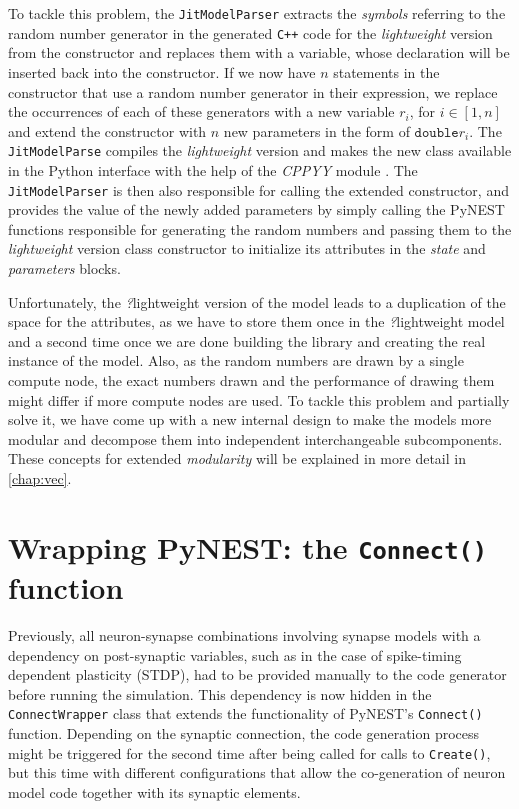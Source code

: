 To tackle this problem, the \texttt{JitModelParser} extracts the \emph{symbols} referring to the random number generator in the generated \texttt{C++} code for the \emph{lightweight} version from the constructor and replaces them with a variable, whose declaration will be inserted back into the constructor. If we now have $n$ statements in the constructor that use a random number generator in their expression, we replace the occurrences of each of these generators with a new variable $r_i$, for $i \in [1, n]$ and extend the constructor with $n$ new parameters in the form of $\texttt{double} r_i$. The \texttt{JitModelParse} compiles the \emph{lightweight} version and makes the new class available in the Python interface with the help of the \emph{CPPYY} module \citep{cppyy}. The \texttt{JitModelParser} is then also responsible for calling the extended constructor, and provides the value of the newly added parameters by simply calling the PyNEST functions responsible for generating the random numbers and passing them to the \emph{lightweight} version class constructor to initialize its attributes in the \emph{state} and \emph{parameters} blocks.

Unfortunately, the \emph?{lightweight} version of the model leads to a duplication of the space for the attributes, as we have to store them once in the \emph?{lightweight} model and a second time once we are done building the library and creating the real instance of the model. Also, as the random numbers are drawn by a single compute node, the exact numbers drawn and the performance of drawing them might differ if more compute nodes are used. To tackle this problem and partially solve it, we have come up with a new internal design to make the models more modular and decompose them into independent interchangeable subcomponents. These concepts for extended \emph{modularity} will be explained in more detail in \autoref{chap:vec}.

\section{Wrapping PyNEST: the \texttt{Connect()} function}

Previously, all neuron-synapse combinations involving synapse models with a dependency on post-synaptic variables, such as in the case of spike-timing dependent plasticity (STDP), had to be provided manually to the code generator before running the simulation. This dependency is now hidden in the \texttt{ConnectWrapper} class that extends the functionality of PyNEST's \texttt{Connect()} function. Depending on the synaptic connection, the code generation process might be triggered for the second time after being called for calls to \texttt{Create()}, but this time with different configurations that allow the co-generation of neuron model code together with its synaptic elements.

